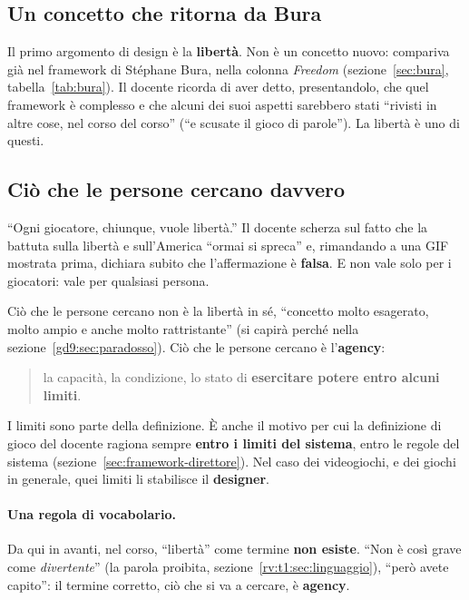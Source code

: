 \subsection{Un concetto che ritorna da Bura}

Il primo argomento di design è la \textbf{libertà}. Non è un concetto nuovo:
compariva già nel framework di Stéphane Bura, nella colonna \emph{Freedom}
(sezione~\ref{sec:bura}, tabella~\ref{tab:bura}). Il docente ricorda di aver
detto, presentandolo, che quel framework è complesso e che alcuni dei suoi
aspetti sarebbero stati ``rivisti in altre cose, nel corso del corso'' (``e
scusate il gioco di parole''). La libertà è uno di questi.

\subsection{Ciò che le persone cercano davvero}

``Ogni giocatore, chiunque, vuole libertà.'' Il docente scherza sul fatto che
la battuta sulla libertà e sull'America ``ormai si spreca'' e, rimandando a
una GIF mostrata prima, dichiara subito che l'affermazione è \textbf{falsa}.
E non vale solo per i giocatori: vale per qualsiasi persona.

Ciò che le persone cercano non è la libertà in sé, ``concetto molto
esagerato, molto ampio e anche molto rattristante'' (si capirà perché nella
sezione~\ref{gd9:sec:paradosso}). Ciò che le persone cercano è
l'\textbf{agency}:
\begin{quote}
  la capacità, la condizione, lo stato di \textbf{esercitare potere entro
  alcuni limiti}.
\end{quote}
I limiti sono parte della definizione. È anche il motivo per cui la
definizione di gioco del docente ragiona sempre \textbf{entro i limiti del
sistema}, entro le regole del sistema (sezione~\ref{sec:framework-direttore}).
Nel caso dei videogiochi, e dei giochi in generale, quei limiti li stabilisce
il \textbf{designer}.

\paragraph{Una regola di vocabolario.} Da qui in avanti, nel corso,
``libertà'' come termine \textbf{non esiste}. ``Non è così grave come
\emph{divertente}'' (la parola proibita, sezione~\ref{rv:t1:sec:linguaggio}),
``però avete capito'': il termine corretto, ciò che si va a cercare, è
\textbf{agency}.

